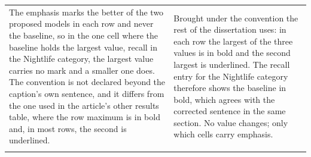 {\begin{longtable}{@{}p{}p{}@{}}
The emphasis marks the better of the two proposed models in each row and never the
baseline, so in the one cell where the baseline holds the largest value, recall in the
Nightlife category, the largest value carries no mark and a smaller one does. The
convention is not declared beyond the caption's own sentence, and it differs from the one
used in the article's other results table, where the row maximum is in bold and, in most
rows, the second is underlined. &
Brought under the convention the rest of the dissertation uses: in each row the largest of
the three values is in bold and the second largest is underlined. The recall entry for the
Nightlife category therefore shows the baseline in bold, which agrees with the corrected
sentence in the same section. No value changes; only which cells carry emphasis. \\
\addlinespace

\end{longtable}}
